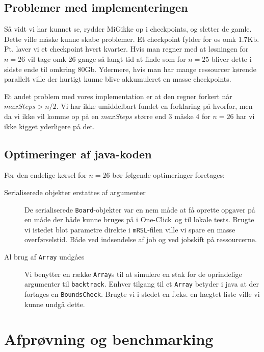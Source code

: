 \documentclass[draft,a4paper,11pt]{article}
\newcommand{\mig}{MiG}
\newcommand{\oc}{One-Click}
\begin{document}
\subsection{Problemer med implementeringen}

Så vidt vi har kunnet se, rydder \mig ikke op i checkpoints, og sletter de
gamle. Dette ville måske kunne skabe problemer. Et checkpoint fylder for os omk
1.7Kb. Pt. laver vi et checkpoint hvert kvarter. Hvis man regner med at
løsningen for $n=26$ vil tage omk 26 gange så langt tid at finde som for $n=25$
bliver dette i sidste ende til omkring 80Gb. Ydermere, hvis man har mange
ressourcer kørende parallelt ville der hurtigt kunne blive akkumuleret en masse
checkpoints. 

Et andet problem med vores implementation er at den regner forkert når
$maxSteps>n/2$. Vi har ikke umiddelbart fundet en forklaring på hvorfor, men da
vi ikke vil komme op på en $maxSteps$ større end 3 måske 4 for $n=26$ har vi
ikke kigget yderligere på det.

\subsection{Optimeringer af java-koden}
Før den endelige kørsel for $n=26$ bør følgende optimeringer foretages:

\begin{description}
	\item[Serialiserede objekter erstattes af argumenter]
	De serialiserede \texttt{Board}-objekter var en nem måde at få oprette opgaver på en måde der både kunne bruges på i \oc\ og til lokale tests. Brugte vi istedet blot parametre direkte i \texttt{mRSL}-filen ville vi spare en masse overførselstid. Både ved indsendelse af job og ved jobskift på ressourcerne.  
	\item[Al brug af \texttt{Array} undgåes]
	Vi benytter en række \texttt{Array}s til at simulere en stak for de oprindelige argumenter til \texttt{backtrack}. Enhver tilgang til et \texttt{Array} betyder i java at der fortages en \texttt{BoundsCheck}. Brugte vi i stedet en f.eks. en hægtet liste ville vi kunne undgå dette.
	 
\end{description}






\section{Afprøvning og benchmarking}\label{benchmarks}
\end{document}
